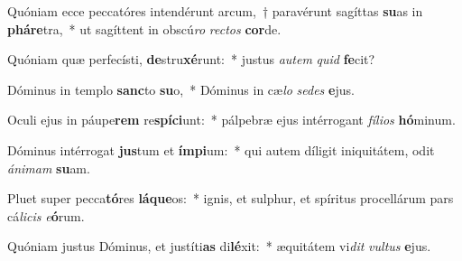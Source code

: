 \item Quóniam ecce peccatóres intendérunt arcum,~† paravérunt sagíttas \textbf{su}as in \textbf{phá}\textbf{re}tra,~* ut sagíttent in obscú\textit{ro} \textit{rec}\textit{tos} \textbf{cor}de.
\item Quóniam quæ perfecísti, \textbf{de}stru\textbf{xé}runt:~* justus \textit{au}\textit{tem} \textit{quid} \textbf{fe}cit?
\item Dóminus in templo \textbf{sanc}to \textbf{su}o,~* Dóminus in cæ\textit{lo} \textit{se}\textit{des} \textbf{e}jus.
\item Oculi ejus in páupe\textbf{rem} re\textbf{spí}\textbf{ci}unt:~* pálpebræ ejus intérrogant \textit{fí}\textit{li}\textit{os} \textbf{hó}minum.
\item Dóminus intérrogat \textbf{jus}tum et \textbf{ím}\textbf{pi}um:~* qui autem díligit iniquitátem, odit \textit{á}\textit{ni}\textit{mam} \textbf{su}am.
\item Pluet super pecca\textbf{tó}res \textbf{lá}\textbf{que}os:~* ignis, et sulphur, et spíritus procellárum pars cá\textit{li}\textit{cis} \textit{e}\textbf{ó}rum.
\item Quóniam justus Dóminus, et justíti\textbf{as} di\textbf{lé}xit:~* æquitátem vi\textit{dit} \textit{vul}\textit{tus} \textbf{e}jus.
